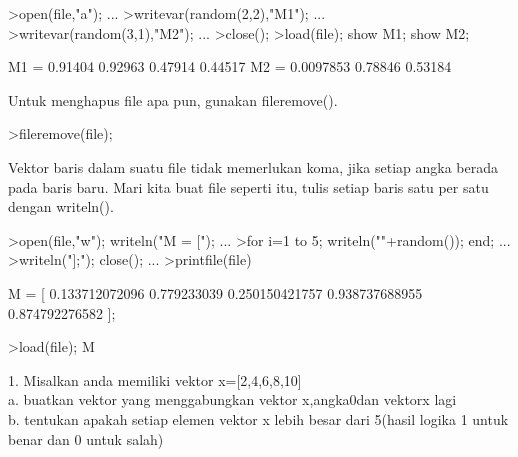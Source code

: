 \documentclass[a4paper,10pt]{article}
\begin{document}
\begin{eulernotebook}
\begin{eulercomment}
\begin{eulercomment}
\begin{eulercomment}
\begin{eulercomment}
\begin{eulercomment}
\begin{eulercomment}
\begin{eulercomment}
\begin{eulercomment}
\begin{eulercomment}
\begin{eulercomment}
\begin{eulercomment}
\begin{eulercomment}
\begin{eulercomment}
\begin{eulercomment}
\begin{eulercomment}
\begin{eulercomment}
\begin{eulerprompt}
>open(file,"a"); ...
>writevar(random(2,2),"M1"); ...
>writevar(random(3,1),"M2"); ...
>close();
>load(file); show M1; show M2;
\end{eulerprompt}
\begin{euleroutput}
  M1 = 
    0.91404   0.92963 
    0.47914   0.44517 
  M2 = 
  0.0097853 
    0.78846 
    0.53184 
\end{euleroutput}
\begin{eulercomment}
Untuk menghapus file apa pun, gunakan fileremove().
\end{eulercomment}
\begin{eulerprompt}
>fileremove(file);
\end{eulerprompt}
\begin{eulercomment}
Vektor baris dalam suatu file tidak memerlukan koma, jika setiap angka
berada pada baris baru. Mari kita buat file seperti itu, tulis setiap
baris satu per satu dengan writeln().
\end{eulercomment}
\begin{eulerprompt}
>open(file,"w"); writeln("M = ["); ...
>for i=1 to 5; writeln(""+random()); end; ...
>writeln("];"); close(); ...
>printfile(file)
\end{eulerprompt}
\begin{euleroutput}
  M = [
  0.133712072096
  0.779233039
  0.250150421757
  0.938737688955
  0.874792276582
  ];
\end{euleroutput}
\begin{eulerprompt}
>load(file); M
\end{eulerprompt}
\begin{euleroutput}
  [0.13371,  0.77923,  0.25015,  0.93874,  0.87479]
\end{euleroutput}
\begin{eulercomment}
1. Misalkan anda memiliki vektor x=[2,4,6,8,10]\\
a. buatkan vektor yang menggabungkan vektor x,angka0dan vektorx lagi\\
b. tentukan apakah setiap elemen vektor x lebih besar dari 5(hasil
logika 1 untuk benar dan 0 untuk salah)


\end{eulercomment}
\end{eulercomment}
\end{eulercomment}
\end{eulercomment}
\end{eulercomment}
\end{eulercomment}
\end{eulercomment}
\end{eulercomment}
\end{eulercomment}
\end{eulercomment}
\end{eulercomment}
\end{eulercomment}
\end{eulercomment}
\end{eulercomment}
\end{eulercomment}
\end{eulercomment}
\end{eulercomment}
\end{eulernotebook}
\end{document}
